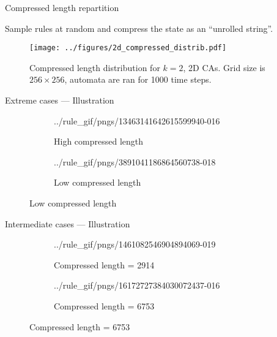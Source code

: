 \documentclass[xcolor=dvipsnames]{beamer}
\begin{document}
\begin{frame}{Compressed length repartition}

  Sample rules at random and compress the state as an ``unrolled string''.

  \begin{figure}[htbp]
    \centering
    \texttt{[image: ../figures/2d\_compressed\_distrib.pdf]}
    \caption{Compressed length distribution for $k=2$, 2D CAs. Grid size is $256
      \times 256$, automata are ran for 1000 time steps.}
    \label{fig:comp_length_2d}
  \end{figure}

\end{frame}


\begin{frame}{Extreme cases --- Illustration}

  \begin{figure}[htbp]
    \centering
    \begin{subfigure}{.49\linewidth}
      \centering
      {../rule_gif/pngs/13463141642615599940-}{0}{16}
      \caption{High compressed length}
    \end{subfigure}
    \begin{subfigure}{.49\linewidth}
      \centering
      {../rule_gif/pngs/3891041186864560738-}{0}{18}
      \caption{Low compressed length}
    \end{subfigure}
  \end{figure}

\end{frame}


\begin{frame}{Intermediate cases --- Illustration}

  \begin{figure}[htbp]
    \centering
    \begin{subfigure}{.49\linewidth}
      \centering
      {../rule_gif/pngs/1461082546904894069-}{0}{19}
      \caption{Compressed length = 2914}
    \end{subfigure}
    \begin{subfigure}{.49\linewidth}
      \centering
      {../rule_gif/pngs/16172727384030072437-}{0}{16}
      \caption{Compressed length = 6753}
    \end{subfigure}
  \end{figure}

\end{frame}
\end{document}
